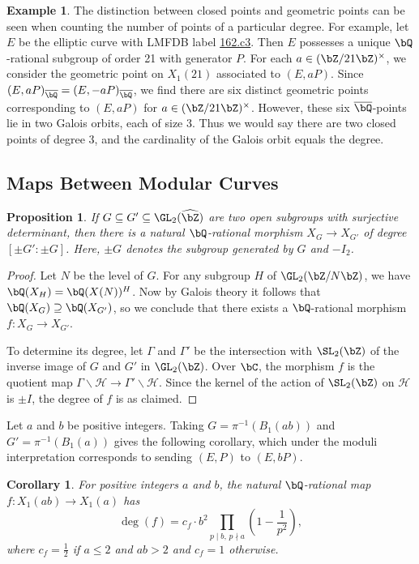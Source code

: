 \documentclass[11pt,reqno]{amsart}
\theoremstyle{plain}
\newtheorem{proposition}[theorem]{Proposition}
\newtheorem{corollary}[theorem]{Corollary}
\theoremstyle{definition}
\newtheorem{example}[theorem]{Example}
\newcommand{\Q}{\bQ}
\newcommand{\Z}{\bZ}
\begin{document}
\begin{example}
The distinction between closed points and geometric points can be seen when counting the number of points of a particular degree. For example, let $E$ be the elliptic curve with LMFDB label \href{https://www.lmfdb.org/EllipticCurve/Q/162/c/3}{162.c3}. Then $E$ possesses a unique $\Q$-rational subgroup of order 21 with generator $P$. For each $a \in (\Z/21\Z)^{\times}$, we consider the geometric point on $X_1(21)$ associated to $(E,aP)$. Since $(E,aP)_{\overline{\Q}}=(E,-aP)_{\overline{\Q}}$, we find there are six distinct geometric points corresponding to $(E,aP)$ for $a \in (\Z/21\Z)^{\times}$. However, these six $\overline{\Q}$-points lie in two Galois orbits, each of size 3. Thus we would say there are two closed points of degree 3, and the cardinality of the Galois orbit equals the degree.
\end{example}


\subsection{Maps Between Modular Curves}

\begin{proposition} \label{prop:mapdegree}
If $G \subseteq G' \subseteq \GL_2(\widehat{\Z})$ are two open subgroups with surjective determinant, then there is a natural $\Q$-rational morphism $X_G \rightarrow X_{G'}$ of degree $[\pm G': \pm G]$. Here, $\pm G$ denotes the subgroup generated by $G$ and $-I_2$.
\end{proposition}
\begin{proof}
Let $N$ be the level of $G$. For any subgroup $H$ of $\GL_2(\Z /N\Z)$, we have $\Q(X_H)=\Q(X(N))^H$. Now by Galois theory it follows that $\Q(X_G) \supseteq \Q(X_{G'})$, so we conclude that there exists a $\Q$-rational morphism $f:X_G \rightarrow X_{G'}$.

To determine its degree, let $\Gamma$ and $\Gamma'$ be the intersection with $\SL_2(\Z)$ of the inverse image of $G$ and $G'$ in $\GL_2(\Z)$. Over $\bC$, the morphism $f$ is the quotient map $\Gamma \backslash \mathcal{H} \rightarrow \Gamma' \backslash \mathcal{H}$. Since the kernel of the action of $\SL_2(\Z)$ on $\mathcal H$ is $\pm I$, the degree of $f$ is as claimed.
    \end{proof}
Let $a$ and $b$ be positive integers. Taking $G=\pi^{-1}(B_1(ab))$ and $G'=\pi^{-1}(B_1(a))$ gives the following corollary, which under the moduli interpretation corresponds to sending $(E,P)$ to $(E,bP)$.    \begin{corollary}\label{Cor:DegreeFormula}
                For positive integers $a$ and $b$, the natural $\Q$-rational map $f\colon X_1(ab) \rightarrow X_1(a)$ has
                \[
                    \deg(f)=
                    c_{f}\cdot b^2 \prod_{p \mid b,\, p \nmid a}
                    \left(1-\frac{1}{p^2}\right),
                \]
                where $c_{f}=\frac{1}{2}$ if $a \leq 2$ and $ab>2$ and $c_{f}=1$ otherwise.
    \end{corollary}
\end{document}
